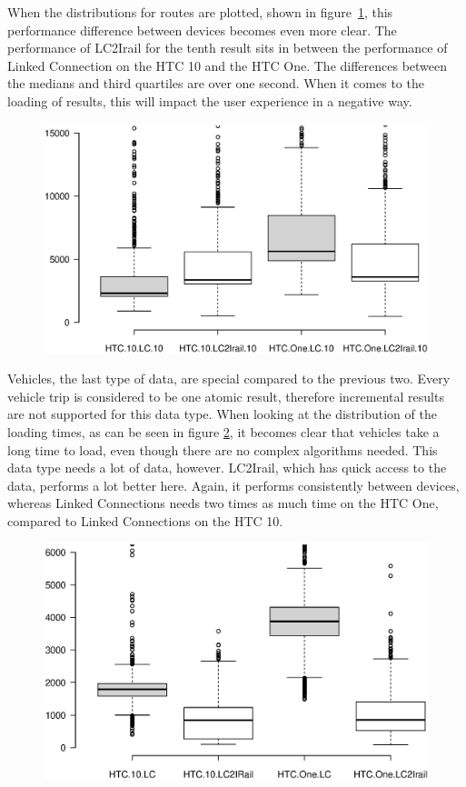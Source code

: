 \documentclass[twocolumn]{phdsymp} %
\begin{document}
When the distributions for routes are plotted, shown in figure~\ref{fig:routebox}, this performance difference between devices becomes even more clear. The performance of LC2Irail for the tenth result sits in between the performance of Linked Connection on the HTC 10 and the HTC One. The differences between the medians and third quartiles are over one second. When it comes to the loading of results, this will impact the user experience in a negative way.

\begin{figure}[ht]
	\begin{center}
		\includegraphics[trim=3cm 4cm 0 0, width=.50\textwidth]{images/boxplot_routes_10.eps}
		\caption{\label{fig:routebox} }
	\end{center}
\end{figure}

Vehicles, the last type of data, are special compared to the previous two. Every vehicle trip is considered to be one atomic result, therefore incremental results are not supported for this data type. When looking at the distribution of the loading times, as can be seen in figure \ref{fig:vehicle}, it becomes clear that vehicles take a long time to load, even though there are no complex algorithms needed. This data type needs a lot of data, however. LC2Irail, which has quick access to the data, performs a lot better here. Again, it performs consistently between devices, whereas Linked Connections needs two times as much time on the HTC One, compared to Linked Connections on the HTC 10.

\begin{figure}[ht]
	\begin{center}
		\includegraphics[trim=3cm 4cm 0 0, width=.50\textwidth]{images/boxplot_vehicles.eps}
		\caption{\label{fig:vehicle} }
	\end{center}
\end{figure}
\end{document}

